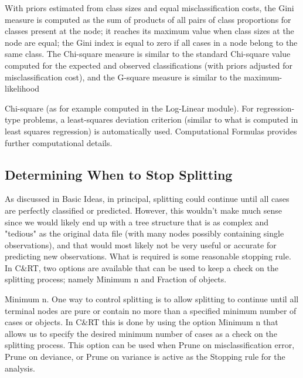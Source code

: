 With priors estimated from class sizes and equal misclassification costs, the Gini measure is computed as the sum of products of all pairs of class proportions for classes present at the node; it reaches its maximum value when class sizes at the node are equal; the Gini index is equal to zero if all cases in a node belong to the same class. The Chi-square measure is similar to the standard Chi-square value computed for the expected and observed classifications (with priors adjusted for misclassification cost), and the G-square measure is similar to the maximum-likelihood 

Chi-square (as for example computed in the Log-Linear module). For regression-type problems, a least-squares deviation criterion (similar to what is computed in least squares regression) is automatically used. Computational Formulas provides further computational details.

\subsection{Determining When to Stop Splitting}

As discussed in Basic Ideas, in principal, splitting could continue until all cases are perfectly classified or predicted. However, this wouldn't make much sense since we would likely end up with a tree structure that is as complex and "tedious" as the original data file (with many nodes possibly containing single observations), and that would most likely not be very useful or accurate for predicting new observations. What is required is some reasonable stopping rule. In C&RT, two options are available that can be used to keep a check on the splitting process; namely Minimum n and Fraction of objects.

Minimum n. One way to control splitting is to allow splitting to continue until all terminal nodes are pure or contain no more than a specified minimum number of cases or objects. In C&RT this is done by using the option Minimum n that allows us to specify the desired minimum number of cases as a check on the splitting process. This option can be used when Prune on misclassification error, Prune on deviance, or Prune on variance is active as the Stopping rule for the analysis.

